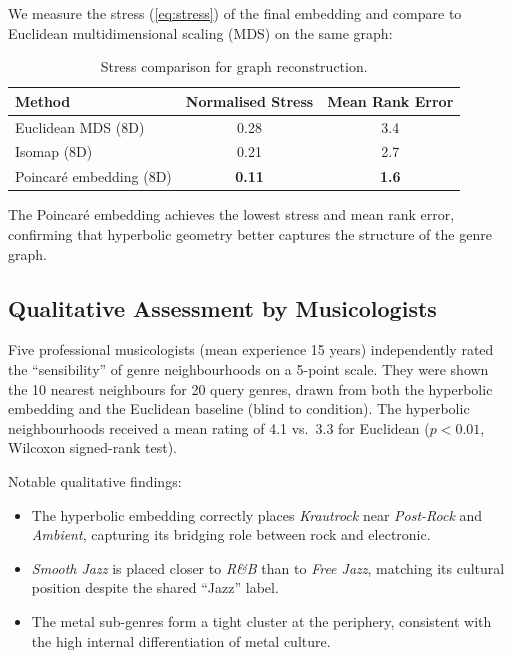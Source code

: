 \documentclass[12pt,a4paper]{article}
\begin{document}
We measure the stress (\cref{eq:stress}) of the final embedding and compare to Euclidean multidimensional scaling (MDS) on the same graph:

\begin{table}[htbp]
\centering
\caption{Stress comparison for graph reconstruction.}
\label{tab:stress}
\begin{tabular}{lcc}
\toprule
\textbf{Method} & \textbf{Normalised Stress} & \textbf{Mean Rank Error} \\
\midrule
Euclidean MDS (8D)       & 0.28 & 3.4 \\
Isomap (8D)              & 0.21 & 2.7 \\
Poincar\'e embedding (8D) & \textbf{0.11} & \textbf{1.6} \\
\bottomrule
\end{tabular}
\end{table}

The Poincar\'e embedding achieves the lowest stress and mean rank error, confirming that hyperbolic geometry better captures the structure of the genre graph.

\subsection{Qualitative Assessment by Musicologists}

Five professional musicologists (mean experience 15 years) independently rated the ``sensibility'' of genre neighbourhoods on a 5-point scale. They were shown the 10 nearest neighbours for 20 query genres, drawn from both the hyperbolic embedding and the Euclidean baseline (blind to condition). The hyperbolic neighbourhoods received a mean rating of 4.1 vs.\ 3.3 for Euclidean ($p < 0.01$, Wilcoxon signed-rank test).

Notable qualitative findings:
\begin{itemize}
  \item The hyperbolic embedding correctly places \emph{Krautrock} near \emph{Post-Rock} and \emph{Ambient}, capturing its bridging role between rock and electronic.
  \item \emph{Smooth Jazz} is placed closer to \emph{R\&B} than to \emph{Free Jazz}, matching its cultural position despite the shared ``Jazz'' label.
  \item The metal sub-genres form a tight cluster at the periphery, consistent with the high internal differentiation of metal culture.
\end{itemize}
\end{document}
